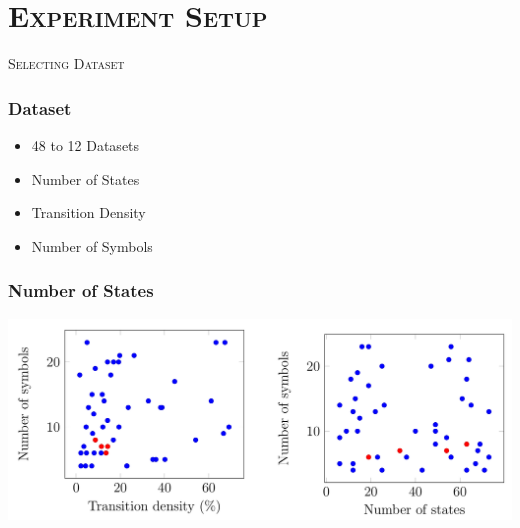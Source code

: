 \section{\scshape Experiment Setup}



\begin{frame}
	\center \huge \scshape Selecting Dataset
\end{frame}

\begin{frame}
	\frametitle{Dataset}
	\begin{itemize}
		\item 48 to 12 Datasets
		\item Number of States
		\item Transition Density
		\item Number of Symbols
	\end{itemize}
\end{frame}

\begin{frame}
	\frametitle{Number of States}
		\begin{centering}
			\includegraphics[width=1\textwidth]{images/states.png}
		\end{centering}
\end{frame}


